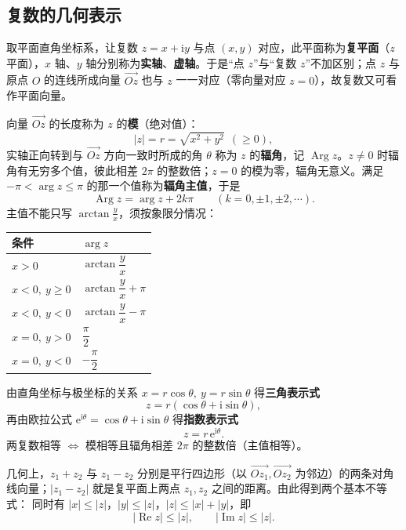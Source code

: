 
\subsection{复数的几何表示}
取平面直角坐标系，让复数 \(z=x+\mathrm{i}y\) 与点 \((x,y)\) 对应，此平面称为\textbf{复平面}（\(z\) 平面），\(x\) 轴、\(y\) 轴分别称为\textbf{实轴}、\textbf{虚轴}。于是“点 \(z\)”与“复数 \(z\)”不加区别；点 \(z\) 与原点 \(O\) 的连线所成向量 \(\overrightarrow{Oz}\) 也与 \(z\) 一一对应（零向量对应 \(z=0\)），故复数又可看作平面向量。

向量 \(\overrightarrow{Oz}\) 的长度称为 \(z\) 的\textbf{模}（绝对值）：
\[
|z|=r=\sqrt{x^{2}+y^{2}}\ \ (\geq 0),
\]
实轴正向转到与 \(\overrightarrow{Oz}\) 方向一致时所成的角 \(\theta\) 称为 \(z\) 的\textbf{辐角}，记 \(\operatorname{Arg}z\)。\(z\neq 0\) 时辐角有无穷多个值，彼此相差 \(2\pi\) 的整数倍；\(z=0\) 的模为零，辐角无意义。满足 \(-\pi<\arg z\leqslant \pi\) 的那一个值称为\textbf{辐角主值}，于是
\[
\operatorname{Arg}z=\arg z+2k\pi\qquad (k=0,\pm 1,\pm 2,\cdots).
\]
主值不能只写 \(\arctan\frac{y}{x}\)，须按象限分情况：

\begin{center}
\begin{tabular}{ll}
\toprule
条件 & \(\arg z\) \\
\midrule
\(x>0\) & \(\arctan\dfrac{y}{x}\) \\
\(x<0,\ y\geqslant 0\) & \(\arctan\dfrac{y}{x}+\pi\) \\
\(x<0,\ y<0\) & \(\arctan\dfrac{y}{x}-\pi\) \\
\(x=0,\ y>0\) & \(\dfrac{\pi}{2}\) \\
\(x=0,\ y<0\) & \(-\dfrac{\pi}{2}\) \\
\bottomrule
\end{tabular}
\end{center}

由直角坐标与极坐标的关系 \(x=r\cos\theta,\ y=r\sin\theta\) 得\textbf{三角表示式}
\[
z=r(\cos\theta+\mathrm{i}\sin\theta),
\]
再由欧拉公式 \(\mathrm{e}^{\mathrm{i}\theta}=\cos\theta+\mathrm{i}\sin\theta\) 得\textbf{指数表示式}
\[
z=r\,\mathrm{e}^{\mathrm{i}\theta}.
\]
两复数相等 \(\iff\) 模相等且辐角相差 \(2\pi\) 的整数倍（主值相等）。

几何上，\(z_{1}+z_{2}\) 与 \(z_{1}-z_{2}\) 分别是平行四边形（以 \(\overrightarrow{Oz_{1}},\overrightarrow{Oz_{2}}\) 为邻边）的两条对角线向量；\(|z_{1}-z_{2}|\) 就是复平面上两点 \(z_{1},z_{2}\) 之间的距离。由此得到两个基本不等式：
同时有 \(|x|\leqslant |z|\)，\(|y|\leqslant |z|\)，\(|z|\leqslant |x|+|y|\)，即
\[
|\operatorname{Re}z|\leqslant |z|,\qquad |\operatorname{Im}z|\leqslant |z|.
\]

